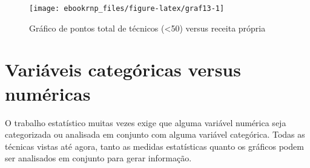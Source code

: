 \documentclass[11pt,]{style/krantz}
\makeatletter
\newenvironment{Shaded}{\begin{snugshade}}{\end{snugshade}}
\newcommand{\DataTypeTok}[1]{\textcolor[rgb]{0.13,0.29,0.53}{#1}}
\newcommand{\DecValTok}[1]{\textcolor[rgb]{0.00,0.00,0.81}{#1}}
\newcommand{\KeywordTok}[1]{\textcolor[rgb]{0.13,0.29,0.53}{\textbf{#1}}}
\newcommand{\NormalTok}[1]{#1}
\newcommand{\OperatorTok}[1]{\textcolor[rgb]{0.81,0.36,0.00}{\textbf{#1}}}
\newcommand{\StringTok}[1]{\textcolor[rgb]{0.31,0.60,0.02}{#1}}
\newenvironment{kframe}{%
\medskip{}
\setlength{\fboxsep}{.8em}
 \def\at@end@of@kframe{}%
 \ifinner\ifhmode%
  \def\at@end@of@kframe{\end{minipage}}%
  \begin{minipage}{\columnwidth}%
 \fi\fi%
 \def\FrameCommand##1{\hskip\@totalleftmargin \hskip-\fboxsep
 \colorbox{shadecolor}{##1}\hskip-\fboxsep
     \hskip-\linewidth \hskip-\@totalleftmargin \hskip\columnwidth}%
 \MakeFramed {\advance\hsize-\width
   \@totalleftmargin\z@ \linewidth\hsize
   \@setminipage}}%
 {\par\unskip\endMakeFramed%
 \at@end@of@kframe}
\renewenvironment{Shaded}{\begin{kframe}}{\end{kframe}}
\theoremstyle{definition}
\theoremstyle{definition}
\theoremstyle{definition}
\theoremstyle{remark}
\makeatother
\begin{document}
\begin{Shaded}
\end{Shaded}

\begin{figure}[H]

{\centering \texttt{[image: ebookrnp\_files/figure-latex/graf13-1]} 

}

\caption{Gráfico de pontos total de técnicos (<50) versus receita própria}\label{fig:graf13}
\end{figure}

\hypertarget{variaveis-categoricas-versus-numericas}{%
\section{Variáveis categóricas versus numéricas}\label{variaveis-categoricas-versus-numericas}}

O trabalho estatístico muitas vezes exige que alguma variável numérica seja categorizada ou analisada em conjunto com alguma variável categórica. Todas as técnicas vistas até agora, tanto as medidas estatísticas quanto os gráficos podem ser analisados em conjunto para gerar informação.
\end{document}
